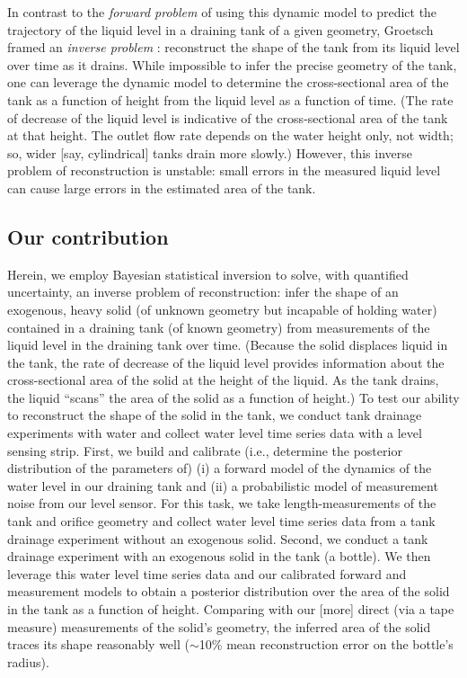 \documentclass[openacc]{rsproca_new}%
\begin{document}
In contrast to the \emph{forward problem} of using this dynamic model to predict the trajectory of the liquid level in a draining tank of a given geometry, Groetsch \cite{groetsch1993inverse,groetsch1999inverse} framed an \emph{inverse problem} \cite{groetsch1993inverse,neto2012introduction,tarantola2005inverse}: reconstruct the shape of the tank from its liquid level over time as it drains. 
While impossible to infer the precise geometry of the tank, one can leverage the dynamic model to determine the cross-sectional area of the tank as a function of height from the liquid level as a function of time. (The rate of decrease of the liquid level is indicative of the cross-sectional area of the tank at that height. The outlet flow rate depends on the water height only, not width; so, wider [say, cylindrical] tanks drain more slowly.)
However, this inverse problem of reconstruction is unstable: small errors in the measured liquid level can cause large errors in the estimated area of the tank. \cite{groetsch1993inverse}

\subsection{Our contribution}
Herein, we employ Bayesian statistical inversion \cite{calvetti2018inverse,waqar2023tutorial,kaipio2006statistical,dashti2013bayesian} to solve, with quantified uncertainty, an inverse problem of reconstruction: infer the shape of an exogenous, heavy solid (of unknown geometry but incapable of holding water) contained in a draining tank (of known geometry) from measurements of the liquid level in the draining tank over time.
(Because the solid displaces liquid in the tank, the rate of decrease of the liquid level provides information about the cross-sectional area of the solid at the height of the liquid.
As the tank drains, the liquid ``scans'' the area of the solid as a function of height.)
To test our ability to reconstruct the shape of the solid in the tank, we conduct tank drainage experiments with water and collect water level time series data with a level sensing strip. First, we build and calibrate (i.e., determine the posterior distribution of the parameters of) (i) a forward model of the dynamics of the water level in our draining tank and (ii) a probabilistic model of measurement noise from our level sensor.
For this task, we take length-measurements of the tank and orifice geometry and collect water level time series data from a tank drainage experiment without an exogenous solid. 
Second, we conduct a tank drainage experiment with an exogenous solid in the tank (a bottle). We then leverage this water level time series data and our calibrated forward and measurement models to obtain a posterior distribution over the area of the solid in the tank as a function of height.
Comparing with our [more] direct (via a tape measure) measurements of the solid's geometry, the inferred area of the solid traces its shape reasonably well ($\sim$10\% mean reconstruction error on the bottle's radius). 
\end{document}
